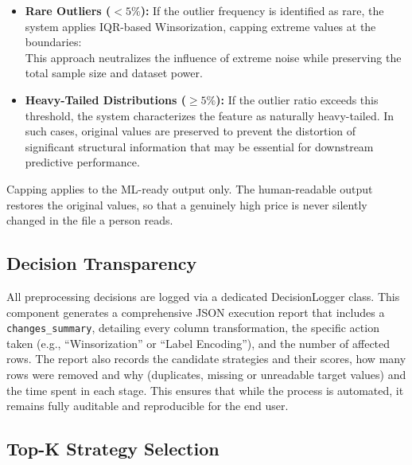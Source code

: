\documentclass[11pt,a4paper]{article}
\begin{document}
\begin{itemize}
    \item \textbf{Rare Outliers ($< 5\%$):} If the outlier frequency is identified as rare, the system applies IQR-based Winsorization, capping extreme values at the boundaries:
    \begin{equation}
        [Q_1 - 1.5 \times \text{IQR}, \quad Q_3 + 1.5 \times \text{IQR}]
    \end{equation}
    This approach neutralizes the influence of extreme noise while preserving the total sample size and dataset power.

    \item \textbf{Heavy-Tailed Distributions ($\geq 5\%$):} If the outlier ratio exceeds this threshold, the system characterizes the feature as naturally heavy-tailed. In such cases, original values are preserved to prevent the distortion of significant structural information that may be essential for downstream predictive performance.
\end{itemize}

Capping applies to the ML-ready output only. The human-readable output restores the original values, so that a genuinely high price is never silently changed in the file a person reads.


\subsection{Decision Transparency}

All preprocessing decisions are logged via a dedicated DecisionLogger class. This component generates a comprehensive JSON execution report that includes a \texttt{changes\_summary}, detailing every column transformation, the specific action taken (e.g., ``Winsorization'' or ``Label Encoding''), and the number of affected rows. The report also records the candidate strategies and their scores, how many rows were removed and why (duplicates, missing or unreadable target values) and the time spent in each stage. This ensures that while the process is automated, it remains fully auditable and reproducible for the end user.

\subsection{Top-K Strategy Selection}
\end{document}
